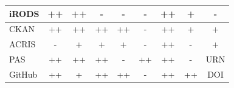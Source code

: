 \begin{table}
{\begin{tabular}{| l | c | c | c | c | c | c | c | c |}
            \hline
            \cellcolor{first-column-blue}iRODS       & \cellcolor{green}++ & \cellcolor{green}++ & \cellcolor{red}-  & \cellcolor{red}-  & \cellcolor{red}-  &  \cellcolor{green}++ & \cellcolor{yellow}+  & \cellcolor{red}- \\
            \hline
            \cellcolor{first-column-blue}CKAN        & \cellcolor{green}++ & \cellcolor{green}++ & \cellcolor{green}++ & \cellcolor{green}++ & \cellcolor{red}-  &  \cellcolor{green}++ & \cellcolor{yellow}+  & \cellcolor{yellow}+ \\
            \hline
            \cellcolor{first-column-blue}ACRIS       & \cellcolor{red}-  & \cellcolor{yellow}+  & \cellcolor{yellow}+  & \cellcolor{yellow}+  & \cellcolor{red}-  &  \cellcolor{green}++ & \cellcolor{red}-  & \cellcolor{yellow}+ \\
            \hline
            \cellcolor{first-column-blue}PAS         & \cellcolor{green}++ & \cellcolor{green}++ & \cellcolor{green}++ & \cellcolor{red}-  & \cellcolor{green}++ &  \cellcolor{green}++ & \cellcolor{red}-  & \cellcolor{green}URN \\
            \hline
            \cellcolor{first-column-blue}GitHub      & \cellcolor{green}++ & \cellcolor{yellow}+  & \cellcolor{green}++ & \cellcolor{green}++ & \cellcolor{red}-  &  \cellcolor{green}++ & \cellcolor{green}++ & \cellcolor{green}DOI \\
            \hline
        \end{tabular}
    }
\end{table}


